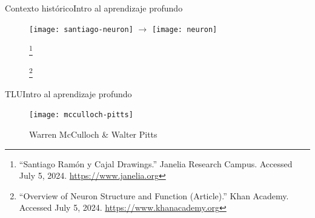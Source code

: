 \documentclass[10pt,border=3pt,tikz]{beamer}
\begin{document}
    \begin{frame}{Contexto histórico}{Intro al aprendizaje profundo}
        \begin{figure}
            \centering
            \texttt{[image: santiago-neuron]} $\longrightarrow$
            \texttt{[image: neuron]}
            
            \let\thefootnote\relax\footnote{{\tiny “Santiago Ramón y Cajal Drawings.” Janelia Research Campus. Accessed July 5, 2024. \href{https://www.janelia.org/archive/santiago-ramón-y-cajal-drawings}{https://www.janelia.org}}}
            
            \let\thefootnote\relax\footnote{{\tiny “Overview of Neuron Structure and Function (Article).” Khan Academy. Accessed July 5, 2024. \href{https://www.khanacademy.org/science/biology/human-biology/neuron-nervous-system/a/overview-of-neuron-structure-and-function}{https://www.khanacademy.org}}}
        \end{figure}
    \end{frame}
    
    \begin{frame}{TLU}{Intro al aprendizaje profundo}
        \begin{figure}
            \centering
            \texttt{[image: mcculloch-pitts]}
            \caption{Warren McCulloch \& Walter Pitts}
        \end{figure}
    \end{frame}
    
\end{document}
